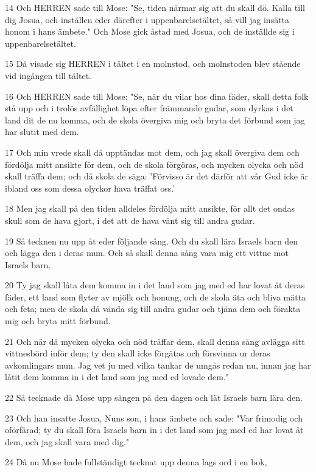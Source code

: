 \par 14 Och HERREN sade till Mose: "Se, tiden närmar sig att du skall dö. Kalla till dig Josua, och inställen eder därefter i uppenbarelsetältet, så vill jag insätta honom i hans ämbete." Och Mose gick åstad med Josua, och de inställde sig i uppenbarelsetältet.
\par 15 Då visade sig HERREN i tältet i en molnstod, och molnstoden blev stående vid ingången till tältet.
\par 16 Och HERREN sade till Mose: "Se, när du vilar hos dina fäder, skall detta folk stå upp och i trolös avfällighet löpa efter främmande gudar, som dyrkas i det land dit de nu komma, och de skola övergiva mig och bryta det förbund som jag har slutit med dem.
\par 17 Och min vrede skall då upptändas mot dem, och jag skall övergiva dem och fördölja mitt ansikte för dem, och de skola förgöras, och mycken olycka och nöd skall träffa dem; och då skola de säga: 'Förvisso är det därför att vår Gud icke är ibland oss som dessa olyckor hava träffat oss.'
\par 18 Men jag skall på den tiden alldeles fördölja mitt ansikte, för allt det ondas skull som de hava gjort, i det att de hava vänt sig till andra gudar.
\par 19 Så tecknen nu upp åt eder följande sång. Och du skall lära Israels barn den och lägga den i deras mun. Och så skall denna sång vara mig ett vittne mot Israels barn.
\par 20 Ty jag skall låta dem komma in i det land som jag med ed har lovat åt deras fäder, ett land som flyter av mjölk och honung, och de skola äta och bliva mätta och feta; men de skola då vända sig till andra gudar och tjäna dem och förakta mig och bryta mitt förbund.
\par 21 Och när då mycken olycka och nöd träffar dem, skall denna sång avlägga sitt vittnesbörd inför dem; ty den skall icke förgätas och försvinna ur deras avkomlingars mun. Jag vet ju med vilka tankar de umgås redan nu, innan jag har låtit dem komma in i det land som jag med ed lovade dem."
\par 22 Så tecknade då Mose upp sången på den dagen och lät Israels barn lära den.
\par 23 Och han insatte Josua, Nuns son, i hans ämbete och sade: "Var frimodig och oförfärad; ty du skall föra Israels barn in i det land som jag med ed har lovat åt dem, och jag skall vara med dig."
\par 24 Då nu Mose hade fullständigt tecknat upp denna lags ord i en bok,
